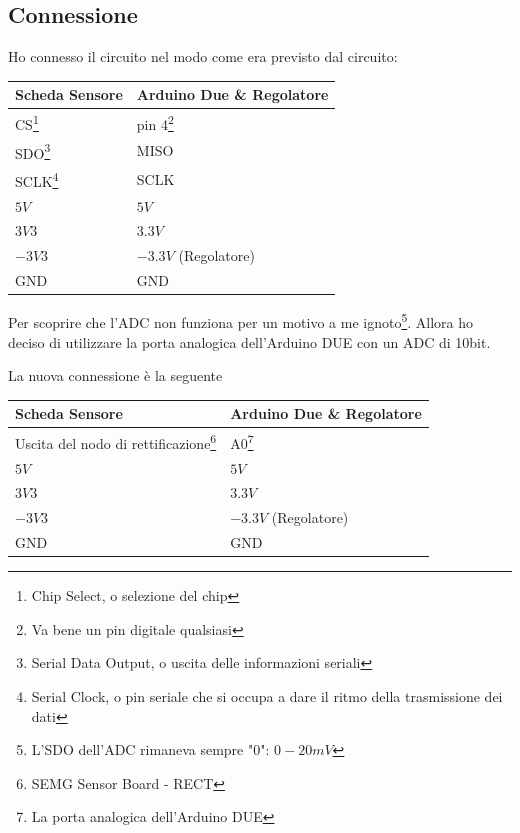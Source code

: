 \documentclass[a4paper, 10pt, final]{article} %
\begin{document}
    \subsection{Connessione}
    Ho connesso il circuito nel modo come era previsto dal circuito:
    \begin{center}
    \begin{tabular}{ ||l|l|| }
        \hline
        \multicolumn{1}{||l|}{Scheda Sensore} & \multicolumn{1}{|l||}{Arduino Due \& Regolatore} \\
        \hline
        \hline
        CS\footnote{Chip Select, o selezione del chip} & pin 4\footnote{Va bene un pin digitale qualsiasi}\\ 
        \hline
        SDO\footnote{Serial Data Output, o uscita delle informazioni seriali} & MISO\\  
        \hline
        SCLK\footnote{Serial Clock, o pin seriale che si occupa a dare il ritmo della trasmissione dei dati} & SCLK\\
        \hline
        $5V$   & $5V$\\
        \hline
        $3V3$  & $3.3V$\\
        \hline
        $-3V3$ & $-3.3V$ (Regolatore)\\
        \hline
        GND    & GND\\
        \hline
    \end{tabular}
    \end{center}
    \noindent Per scoprire che l'ADC non funziona per un motivo a me ignoto\footnote{L'SDO dell'ADC rimaneva sempre "$0$": $0-20mV$}.
    Allora ho deciso di utilizzare la porta analogica dell'Arduino DUE con un ADC di 10bit.

    \noindent La nuova connessione \`{e} la seguente
    \begin{center}
        \begin{tabular}{ ||l|l|| }
            \hline
            \multicolumn{1}{||l|}{Scheda Sensore} & \multicolumn{1}{|l||}{Arduino Due \& Regolatore} \\
            \hline
            \hline
            Uscita del nodo di rettificazione\footnote{SEMG Sensor Board - RECT} & A0\footnote{La porta analogica dell'Arduino DUE}\\
            \hline
            $5V$   & $5V$\\
            \hline
            $3V3$  & $3.3V$\\
            \hline
            $-3V3$ & $-3.3V$ (Regolatore)\\
            \hline
            GND    & GND\\
            \hline
        \end{tabular}
    \end{center}
\end{document}

